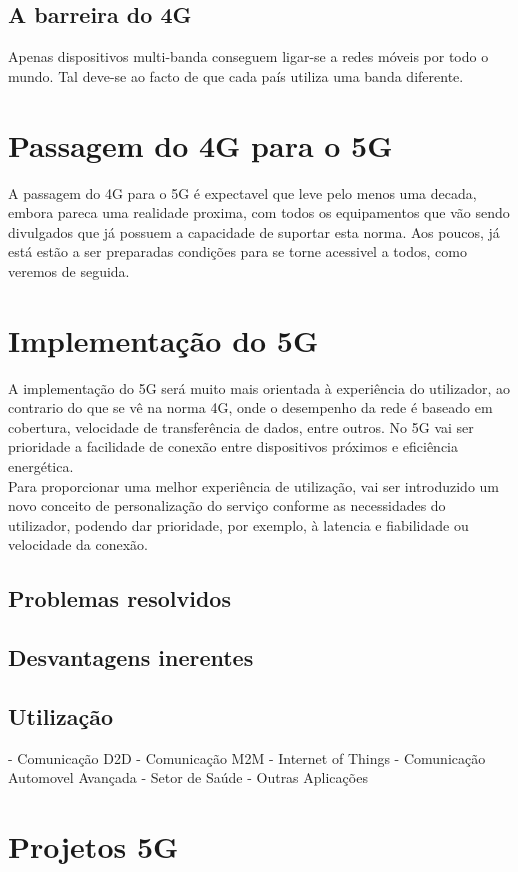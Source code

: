 \documentclass{llncs}
\begin{document}
\subsection{A barreira do 4G}
Apenas dispositivos multi-banda conseguem ligar-se a redes móveis por
todo o mundo. Tal deve-se ao facto de que cada país utiliza uma banda
diferente.

\section{Passagem do 4G para o 5G}
A passagem do 4G para o 5G é expectavel que leve pelo menos uma
decada, embora pareca uma realidade proxima, com todos os 
equipamentos que vão sendo divulgados que já possuem a capacidade
de suportar esta norma. Aos poucos, já está estão a ser preparadas
condições para se torne acessivel a todos, como veremos de 
seguida.

\section{Implementação do 5G}
A implementação do 5G será muito mais orientada à experiência do
utilizador, ao contrario do que se vê na norma 4G, onde o 
desempenho da rede é baseado em cobertura, velocidade de 
transferência de dados, entre outros. No 5G vai ser prioridade a
facilidade de conexão entre dispositivos próximos e eficiência
energética.\\
Para proporcionar uma melhor experiência de utilização, vai ser
introduzido um novo conceito de personalização do serviço
conforme as necessidades do utilizador, podendo dar prioridade,
por exemplo, à latencia e fiabilidade ou velocidade da conexão.

\subsection{Problemas resolvidos}
\subsection{Desvantagens inerentes}
\subsection{Utilização}
- Comunicação D2D
- Comunicação M2M
- Internet of Things
- Comunicação Automovel Avançada
- Setor de Saúde
- Outras Aplicações
\section{Projetos 5G}
\end{document}
